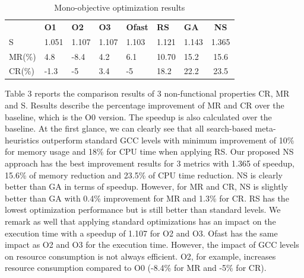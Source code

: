 \begin{table}[h]
	\centering
	\caption{Mono-objective optimization results}
	\label{my-label}
	\begin{tabular}{|l|l|l|l|l|l|l|c|}
		\hline
		& \textbf{O1}                    & \textbf{O2}                    & \textbf{O3}                    & \textbf{Ofast}                 & \textbf{RS}                    & \textbf{GA}                    & 
		\textbf{NS} \\
		\hhline{|=|=|=|=|=|=|=|=|}
		S  &  1.051 & 1.107  & 1.107  & 1.103  & 1.121  &  1.143 &  1.365  \\ \hline
		MR(\%) & 4.8  & -8.4  &  4.2 & 6.1  &  10.70 & 15.2  &  15.6  \\ \hline
		CR(\%) & -1.3  & -5  & 3.4  & -5  &  18.2 & 22.2  &  23.5  \\ \hline
	\end{tabular}
\end{table}
Table 3 reports the comparison results of 3 non-functional properties CR, MR and S. Results describe the percentage improvement of MR and CR over the baseline, which is the O0 version. The speedup is also calculated over the baseline. At the first glance, we can clearly see that all search-based meta-heuristics outperform standard GCC levels with minimum improvement of 10\% for memory usage and 18\% for CPU time when applying RS. 
Our proposed NS approach has the best improvement results for 3 metrics with 1.365 of speedup, 15.6\% of memory reduction and 23.5\% of CPU time reduction. NS is clearly better than GA in terms of speedup. However, for MR and CR, NS is slightly better than GA with 0.4\% improvement for MR and 1.3\% for CR. RS has the lowest optimization performance but is still better than standard levels.
We remark as well that applying standard optimizations has an impact on the execution time with a speedup of 1.107 for O2 and O3. Ofast has the same impact as O2 and O3 for the execution time. However, the impact of GCC levels on resource consumption is not always efficient. O2, for example, increases resource consumption compared to O0 (-8.4\% for MR and -5\% for CR).
 	
